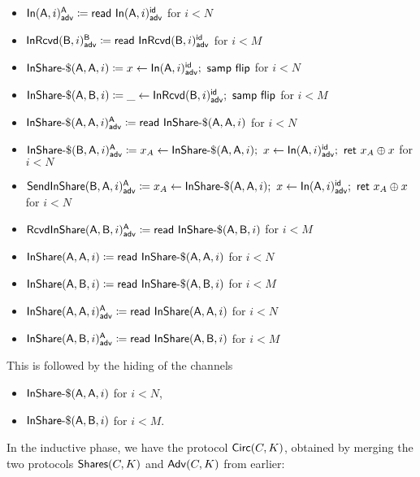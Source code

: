 \begin{itemize}
\item {\color{blue} $\LeakIn(\A,i)^{\A}_\adv \coloneqq \read{\LeakIn(\A,i)^\id_\adv}$ for $i < N$}
\item {\color{blue} $\LeakInRcvd(\B,i)^{\B}_\adv \coloneqq \read{\LeakInRcvd(\B,i)^\id_\adv}$ for $i < M$}
\item $\InShareGen(\A,\A,i) \coloneqq x \leftarrow \LeakIn(\A,i)^\id_\adv; \ \samp{\flip}$ for $i < N$
\item $\InShareGen(\A,\B,i) \coloneqq \_ \leftarrow \LeakInRcvd(\B,i)^\id_\adv; \ \samp{\flip}$ for $i < M$
\item {\color{blue} $\LeakInShareGen(\A,\A,i)^\A_\adv \coloneqq \read{\InShareGen(\A,\A,i)}$ for $i < N$}
\item {\color{blue} $\LeakInShareGen(\B,\A,i)^\A_\adv \coloneqq x_A \leftarrow \InShareGen(\A,\A,i); \ x \leftarrow \LeakIn(\A,i)^\id_\adv; \ \ret{x_A \oplus x}$ for $i < N$}
\item {\color{blue} $\LeakSendInShare(\B,\A,i)^\A_\adv \coloneqq x_A \leftarrow \InShareGen(\A,\A,i); \ x \leftarrow \LeakIn(\A,i)^\id_\adv; \ \ret{x_A \oplus x}$ for $i < N$}
\item {\color{blue} $\LeakRcvdInShare(\A,\B,i)^\A_\adv \coloneqq \read{\InShareGen(\A,\B,i)}$ for $i < M$}
\item $\InShare(\A,\A,i) \coloneqq \read{\InShareGen(\A,\A,i)}$ for $i < N$
\item $\InShare(\A,\B,i) \coloneqq \read{\InShareGen(\A,\B,i)}$ for $i < M$
\item {\color{blue} $\LeakInShare(\A,\A,i)^\A_\adv \coloneqq \read{\InShare(\A,\A,i)}$ for $i < N$}
\item {\color{blue} $\LeakInShare(\A,\B,i)^\A_\adv \coloneqq \read{\InShare(\A,\B,i)}$ for $i < M$}
\end{itemize}
This is followed by the hiding of the channels
\begin{itemize}
\item $\InShareGen(\A,\A,i)$ for $i < N$,
\item $\InShareGen(\A,\B,i)$ for $i < M$.
\end{itemize}

\noindent In the inductive phase, we have the protocol $\Circ(C,K)$, obtained by merging the two protocols $\Shares(C,K)$ and $\Adv(C,K)$ from earlier:

